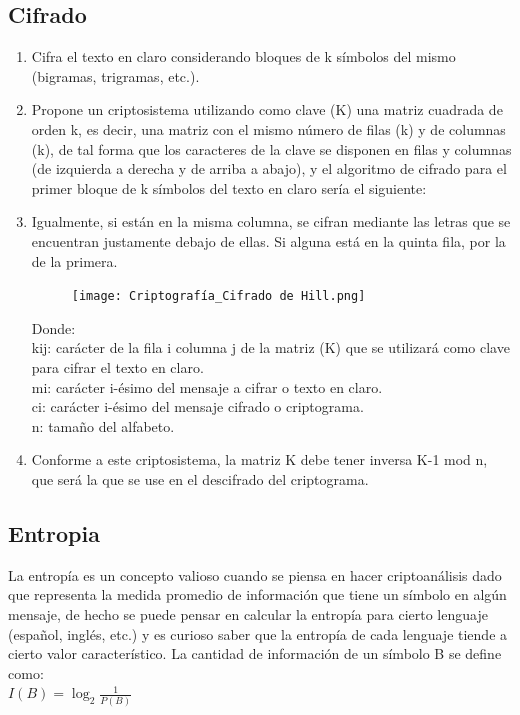 \documentclass[10pt]{article}
\begin{document}
\subsection{Cifrado}

\begin{enumerate}
  \item Cifra el texto en claro considerando bloques de k símbolos del mismo (bigramas, trigramas, etc.).
  \item Propone un criptosistema utilizando como clave (K) una matriz cuadrada de orden k, es decir, una matriz con el mismo número de filas (k) y de columnas (k), de tal forma que los caracteres de la clave se disponen en filas y columnas (de izquierda a derecha y de arriba a abajo), y el algoritmo de cifrado para el primer bloque de k símbolos del texto en claro sería el siguiente:
    
  \item Igualmente, si están en la misma columna,
  se cifran mediante las letras que se
  encuentran justamente debajo de ellas. Si
  alguna está en la quinta fila, por la de la
  primera.  
  \begin{figure}[!ht]
    \centering
    \texttt{[image: Criptografía\_Cifrado de Hill.png]}
    \label{fig_sim}
  \end{figure}
  Donde:\\
kij: carácter de la fila i columna j de la matriz (K) que se utilizará como clave para cifrar el texto en claro.\\
mi: carácter i-ésimo del mensaje a cifrar o texto en claro.\\
ci: carácter i-ésimo del mensaje cifrado o criptograma.\\
n: tamaño del alfabeto.
  \item Conforme a este criptosistema, la matriz K debe tener inversa K-1 mod n, que será la que se use en el descifrado del criptograma.
\end{enumerate}
\newpage
\subsection{Entropia}
\justify
La entropía es un concepto valioso cuando se piensa en hacer 
criptoanálisis dado que representa la medida promedio de 
información que tiene un símbolo en algún mensaje, de hecho se 
puede pensar en calcular la entropía para cierto lenguaje 
(español, inglés, etc.) y es curioso saber que la entropía de cada 
lenguaje tiende a cierto valor característico.
La cantidad de información de un símbolo B se define como:\\
$I(B)=\log_2{\frac{1}{P(B)}}$
\end{document}
